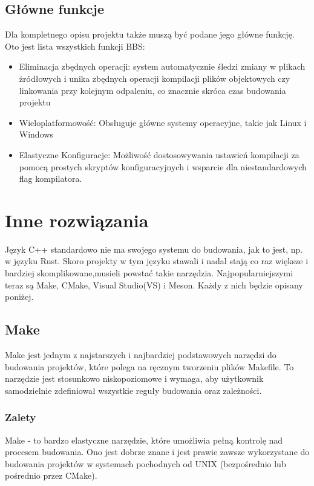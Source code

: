 \subsection{Główne funkcje}
Dla kompletnego opisu projektu także muszą być podane jego główne funkcję. Oto jest lista wszystkich funkcji BBS:

\begin{itemize}
    \item Eliminacja zbędnych operacji: system automatycznie śledzi zmiany w plikach żródłowych i unika zbędnych operacji kompilacji plików objektowych czy linkowania przy kolejnym odpaleniu, co znacznie skróca czas budowania projektu
    \item Wieloplatformowość: Obsługuje główne systemy operacyjne, takie jak Linux i Windows
    \item Elastyczne Konfiguracje: Możliwość dostosowywania ustawień kompilacji za pomocą prostych skryptów konfiguracyjnych i wsparcie dla niestandardowych flag kompilatora.
\end{itemize}

\section{Inne rozwiązania}
Język C++ standardowo nie ma swojego systemu do budowania, jak to jest, np. w języku Rust. Skoro projekty w tym języku stawali i nadal stają co raz większe i bardziej skomplikowane,musieli powstać takie narzędzia. Najpopularniejszymi teraz są Make, CMake, Visual Studio(VS) i Meson. Każdy z nich będzie opisany poniżej.

\subsection{Make}
Make jest jednym z najstarszych i najbardziej podstawowych narzędzi do budowania projektów, które polega na ręcznym tworzeniu plików Makefile. To narzędzie jest stosunkowo niskopoziomowe i wymaga, aby użytkownik samodzielnie zdefiniował wszystkie reguły budowania oraz zależności.

\subsubsection{Zalety}
Make - to bardzo elastyczne narzędzie, które umożliwia pełną kontrolę nad procesem budowania. Ono jest dobrze znane i jest prawie zawsze wykorzystane do budowania projektów w systemach pochodnych od UNIX (bezpośrednio lub pośrednio przez CMake).

